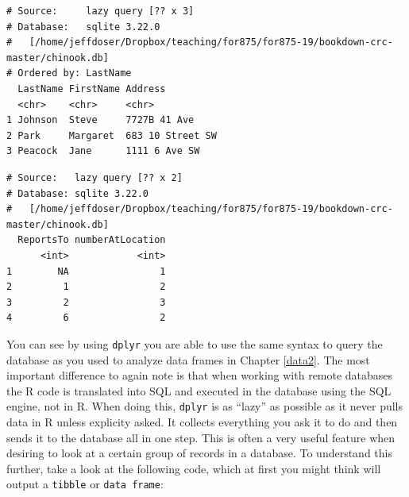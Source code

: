 \documentclass[]{krantz}
\makeatletter
\newenvironment{Shaded}{\begin{snugshade}}{\end{snugshade}}
\newcommand{\DataTypeTok}[1]{\textcolor[rgb]{0.27,0.27,0.27}{#1}}
\newcommand{\KeywordTok}[1]{\textcolor[rgb]{0.27,0.27,0.27}{\textbf{#1}}}
\newcommand{\NormalTok}[1]{#1}
\newcommand{\OperatorTok}[1]{\textcolor[rgb]{0.43,0.43,0.43}{\textbf{#1}}}
\newcommand{\StringTok}[1]{\textcolor[rgb]{0.5,0.5,0.5}{#1}}
\newenvironment{kframe}{%
\medskip{}
\setlength{\fboxsep}{.8em}
 \def\at@end@of@kframe{}%
 \ifinner\ifhmode%
  \def\at@end@of@kframe{\end{minipage}}%
  \begin{minipage}{\columnwidth}%
 \fi\fi%
 \def\FrameCommand##1{\hskip\@totalleftmargin \hskip-\fboxsep
 \colorbox{shadecolor}{##1}\hskip-\fboxsep
     \hskip-\linewidth \hskip-\@totalleftmargin \hskip\columnwidth}%
 \MakeFramed {\advance\hsize-\width
   \@totalleftmargin\z@ \linewidth\hsize
   \@setminipage}}%
 {\par\unskip\endMakeFramed%
 \at@end@of@kframe}
\renewenvironment{Shaded}{\begin{kframe}}{\end{kframe}}
\makeatother
\begin{document}
\begin{Shaded}
\end{Shaded}

\begin{verbatim}
# Source:     lazy query [?? x 3]
# Database:   sqlite 3.22.0
#   [/home/jeffdoser/Dropbox/teaching/for875/for875-19/bookdown-crc-master/chinook.db]
# Ordered by: LastName
  LastName FirstName Address         
  <chr>    <chr>     <chr>           
1 Johnson  Steve     7727B 41 Ave    
2 Park     Margaret  683 10 Street SW
3 Peacock  Jane      1111 6 Ave SW   
\end{verbatim}

\begin{Shaded}
\end{Shaded}

\begin{verbatim}
# Source:   lazy query [?? x 2]
# Database: sqlite 3.22.0
#   [/home/jeffdoser/Dropbox/teaching/for875/for875-19/bookdown-crc-master/chinook.db]
  ReportsTo numberAtLocation
      <int>            <int>
1        NA                1
2         1                2
3         2                3
4         6                2
\end{verbatim}

You can see by using \texttt{dplyr} you are able to use the same syntax to query the database as you used to analyze data frames in Chapter \ref{data2}. The most important difference to again note is that when working with remote databases the R code is translated into SQL and executed in the database using the SQL engine, not in R. When doing this, \texttt{dplyr} is as ``lazy'' as possible as it never pulls data in R unless explicity asked. It collects everything you ask it to do and then sends it to the database all in one step. This is often a very useful feature when desiring to look at a certain group of records in a database. To understand this further, take a look at the following code, which at first you might think will output a \texttt{tibble} or \texttt{data\ frame}:
\end{document}
